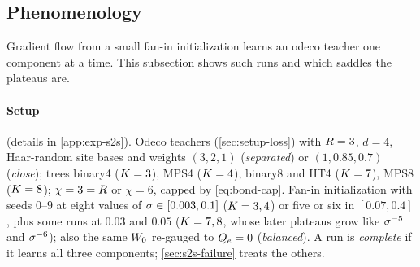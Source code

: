 \subsection{Phenomenology}\label{sec:s2s-phenomenology}

Gradient flow from a small fan-in initialization learns an odeco teacher one component at a time. This
subsection shows such runs and which saddles the plateaus are.

\paragraph{Setup} (details in \cref{app:exp-s2s}).
Odeco teachers (\cref{sec:setup-loss}) with $R=3$, $d=4$, Haar-random site bases and weights $(3,2,1)$
(\emph{separated}) or $(1,0.85,0.7)$ (\emph{close}); trees binary4 ($K=3$), MPS4 ($K=4$), binary8 and HT4
($K=7$), MPS8 ($K=8$); $\chi=3=R$ or $\chi=6$, capped by \eqref{eq:bond-cap}. Fan-in initialization
with seeds $0$--$9$ at eight values of $\sigma\in[0.003,0.1]$ ($K=3,4$) or five or six in $[0.07,0.4]$, plus some
runs at $0.03$ and $0.05$ ($K=7,8$, whose later plateaus grow like $\sigma^{-5}$ and $\sigma^{-6}$); also the same $W_{0}$
re-gauged to
$Q_{e}=0$ (\emph{balanced}). A run is \emph{complete} if it learns all three components; \cref{sec:s2s-failure}
treats the others.

